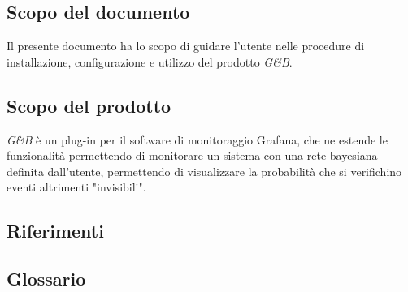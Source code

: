 \subsection{Scopo del documento}
Il presente documento ha lo scopo di guidare l'utente nelle procedure di installazione, configurazione e utilizzo del prodotto \emph{G\&B}.
\subsection{Scopo del prodotto}
\emph{G\&B} è un plug-in per il software di monitoraggio Grafana, che ne estende le funzionalità permettendo di monitorare un sistema con una rete bayesiana definita dall'utente, permettendo di visualizzare la probabilità che si verifichino eventi altrimenti "invisibili". 
\subsection{Riferimenti}
\subsection{Glossario}